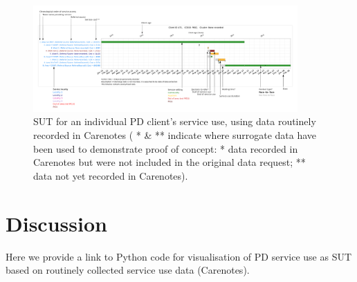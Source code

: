 \documentclass{article}
\begin{document}
\begin{figure}[!h]
	\centering
	\includegraphics[width=0.9\textwidth]{images/200902_PD_service_use_timeline_471_figure.png}%
	\caption{SUT for an individual PD client's service use, using data routinely recorded in Carenotes ( * \& ** indicate where surrogate data have been used to demonstrate proof of concept: * data recorded in Carenotes but were not included in the original data request; ** data not yet recorded in Carenotes).}
	\label{fig:sut}
\end{figure}


\section{Discussion}

Here we provide a link to Python code for visualisation of PD service use as SUT based on routinely collected service use data (Carenotes).
\end{document}
